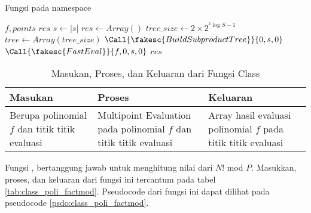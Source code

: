 \begin{algorithm}
	\caption{Fungsi  pada namespace }
	\label{psdo:class_poli_multi_eval}
	\begin{algorithmic}[1]
		\Require $ f, points $
		\Ensure $ res $
		\State $ s \leftarrow |s| $
		\State $ res \leftarrow Array() $
		\State $ tree\_size \leftarrow 2 \times 2 ^{ ^2\log{S-1}}$
		\State $ tree \leftarrow Array(tree\_size) $
		\State $ \Call{\fakesc{BuildSubproductTree}}{0, s, 0}$
		\State $ \Call{\fakesc{FastEval}}{f, 0, s, 0}$
		\State \Return $ res $
	\end{algorithmic}
\end{algorithm}

\begin{table}[]	
	\Centering
	\begin{tabular}{|p{3cm}|p{3cm}|p{3cm}|}
	\hline
	Masukan & Proses & Keluaran \\ \hline
	Berupa polinomial $f$ dan titik titik evaluasi & Multipoint Evaluation pada polinomial $f$ dan titik titik evaluasi & Array hasil evaluasi polinomial $f$ pada titik titik evaluasi \\ \hline
	\end{tabular}
	\caption{Masukan, Proses, dan Keluaran dari Fungsi  Class }
	\label{tab:class_poli_multi_eval}
\end{table}

\newpage

Fungsi , bertanggung jawab untuk menghitung nilai dari $ N! $ mod $ P $. Masukkan, proses, dan keluaran dari fungsi ini tercantum pada tabel \ref{tab:class_poli_factmod}. Pseudocode dari fungsi ini dapat dilihat pada pseudocode \ref{psdo:class_poli_factmod}.

